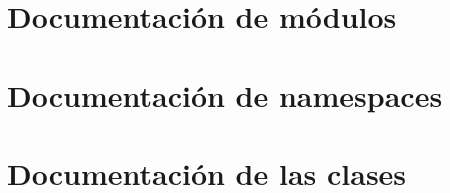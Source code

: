 \documentclass[twoside]{book}
\newcommand{\+}{\discretionary{\mbox{\scriptsize$\hookleftarrow$}}{}{}}
\begin{document}
\chapter{Documentación de módulos}

\chapter{Documentación de namespaces}


\chapter{Documentación de las clases}


























\end{document}
